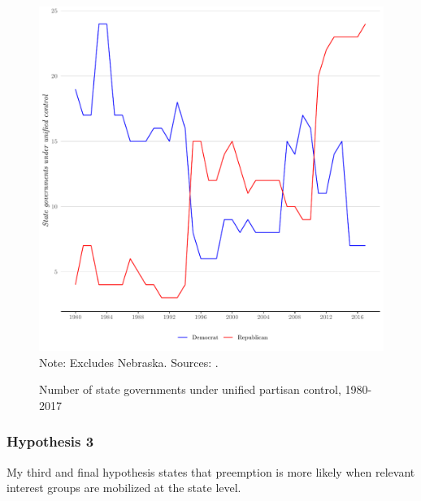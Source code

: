 \documentclass[12pt]{article}
\begin{document}
\begin{figure}[!ht]
\caption{Number of state governments under unified partisan control, 1980-2017}
\label{fig:party}
\centering
\includegraphics[width=.75\textwidth]{plots/party_control}
\newline\scriptsize{Note: Excludes Nebraska. Sources: \textcite{jordanCorrelatesStatePolicy2017,nationalconferenceofstatelegislaturesStatePartisanComposition2019}.}
\end{figure}

\subsubsection*{Hypothesis 3}
My third and final hypothesis states that preemption is more likely when relevant interest groups are mobilized at the state level. 

\singlespacing
\pagebreak
\printbibliography
 
\end{document}

